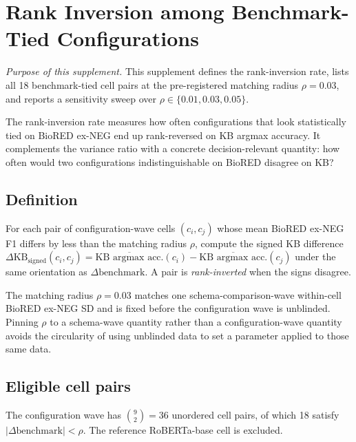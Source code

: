 \section{Rank Inversion among Benchmark-Tied Configurations}
\label{supp:ordinal}

\textit{Purpose of this supplement.}\;
This supplement defines the rank-inversion rate, lists all 18
benchmark-tied cell pairs at the pre-registered matching radius
$\rho = 0.03$, and reports a sensitivity sweep over
$\rho \in \{0.01, 0.03, 0.05\}$.

The rank-inversion rate measures how often configurations that
look statistically tied on BioRED ex-NEG end up rank-reversed on
KB argmax accuracy. It complements the variance ratio with a
concrete decision-relevant quantity: how often would two configurations
indistinguishable on BioRED disagree on KB?

\subsection{Definition}

For each pair of configuration-wave cells $(c_i, c_j)$ whose mean
BioRED ex-NEG F1 differs by less than the matching radius $\rho$,
compute the signed KB difference
$\Delta\text{KB}_{\text{signed}}(c_i, c_j) =
\overline{\text{KB argmax acc.}}(c_i) - \overline{\text{KB argmax acc.}}(c_j)$
under the same orientation as $\Delta\text{benchmark}$. A pair is
\emph{rank-inverted} when the signs disagree.

The matching radius $\rho = 0.03$ matches one
schema-comparison-wave within-cell BioRED ex-NEG SD and is fixed
before the configuration wave is unblinded. Pinning $\rho$ to a
schema-wave quantity rather than a configuration-wave quantity
avoids the circularity of using unblinded data to set a parameter
applied to those same data.

\subsection{Eligible cell pairs}

The configuration wave has $\binom{9}{2} = 36$ unordered cell pairs,
of which 18 satisfy $|\Delta\text{benchmark}| < \rho$. The reference
RoBERTa-base cell is excluded.

